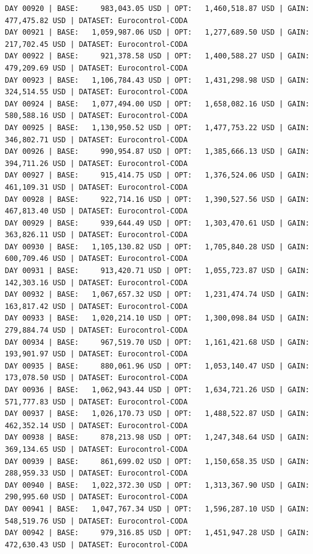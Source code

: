 \documentclass[11pt,a4paper]{article}
\begin{document}
\begin{verbatim}
DAY 00920 | BASE:     983,043.05 USD | OPT:   1,460,518.87 USD | GAIN: 477,475.82 USD | DATASET: Eurocontrol-CODA
DAY 00921 | BASE:   1,059,987.06 USD | OPT:   1,277,689.50 USD | GAIN: 217,702.45 USD | DATASET: Eurocontrol-CODA
DAY 00922 | BASE:     921,378.58 USD | OPT:   1,400,588.27 USD | GAIN: 479,209.69 USD | DATASET: Eurocontrol-CODA
DAY 00923 | BASE:   1,106,784.43 USD | OPT:   1,431,298.98 USD | GAIN: 324,514.55 USD | DATASET: Eurocontrol-CODA
DAY 00924 | BASE:   1,077,494.00 USD | OPT:   1,658,082.16 USD | GAIN: 580,588.16 USD | DATASET: Eurocontrol-CODA
DAY 00925 | BASE:   1,130,950.52 USD | OPT:   1,477,753.22 USD | GAIN: 346,802.71 USD | DATASET: Eurocontrol-CODA
DAY 00926 | BASE:     990,954.87 USD | OPT:   1,385,666.13 USD | GAIN: 394,711.26 USD | DATASET: Eurocontrol-CODA
DAY 00927 | BASE:     915,414.75 USD | OPT:   1,376,524.06 USD | GAIN: 461,109.31 USD | DATASET: Eurocontrol-CODA
DAY 00928 | BASE:     922,714.16 USD | OPT:   1,390,527.56 USD | GAIN: 467,813.40 USD | DATASET: Eurocontrol-CODA
DAY 00929 | BASE:     939,644.49 USD | OPT:   1,303,470.61 USD | GAIN: 363,826.11 USD | DATASET: Eurocontrol-CODA
DAY 00930 | BASE:   1,105,130.82 USD | OPT:   1,705,840.28 USD | GAIN: 600,709.46 USD | DATASET: Eurocontrol-CODA
DAY 00931 | BASE:     913,420.71 USD | OPT:   1,055,723.87 USD | GAIN: 142,303.16 USD | DATASET: Eurocontrol-CODA
DAY 00932 | BASE:   1,067,657.32 USD | OPT:   1,231,474.74 USD | GAIN: 163,817.42 USD | DATASET: Eurocontrol-CODA
DAY 00933 | BASE:   1,020,214.10 USD | OPT:   1,300,098.84 USD | GAIN: 279,884.74 USD | DATASET: Eurocontrol-CODA
DAY 00934 | BASE:     967,519.70 USD | OPT:   1,161,421.68 USD | GAIN: 193,901.97 USD | DATASET: Eurocontrol-CODA
DAY 00935 | BASE:     880,061.96 USD | OPT:   1,053,140.47 USD | GAIN: 173,078.50 USD | DATASET: Eurocontrol-CODA
DAY 00936 | BASE:   1,062,943.44 USD | OPT:   1,634,721.26 USD | GAIN: 571,777.83 USD | DATASET: Eurocontrol-CODA
DAY 00937 | BASE:   1,026,170.73 USD | OPT:   1,488,522.87 USD | GAIN: 462,352.14 USD | DATASET: Eurocontrol-CODA
DAY 00938 | BASE:     878,213.98 USD | OPT:   1,247,348.64 USD | GAIN: 369,134.65 USD | DATASET: Eurocontrol-CODA
DAY 00939 | BASE:     861,699.02 USD | OPT:   1,150,658.35 USD | GAIN: 288,959.33 USD | DATASET: Eurocontrol-CODA
DAY 00940 | BASE:   1,022,372.30 USD | OPT:   1,313,367.90 USD | GAIN: 290,995.60 USD | DATASET: Eurocontrol-CODA
DAY 00941 | BASE:   1,047,767.34 USD | OPT:   1,596,287.10 USD | GAIN: 548,519.76 USD | DATASET: Eurocontrol-CODA
DAY 00942 | BASE:     979,316.85 USD | OPT:   1,451,947.28 USD | GAIN: 472,630.43 USD | DATASET: Eurocontrol-CODA

\end{verbatim}
\end{document}
